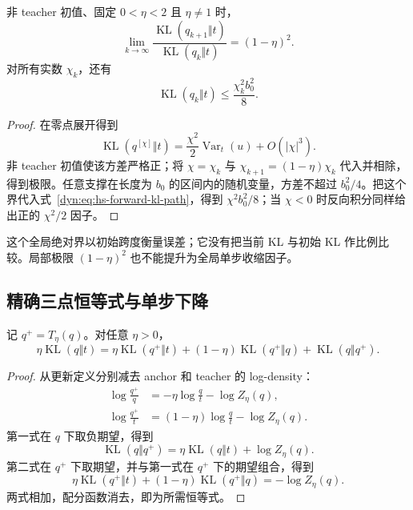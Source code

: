 \documentclass[lang=cn,scheme=chinese,openany]{../book/elegantbook}
\newcommand{\KL}{\operatorname{KL}}
\newcommand{\Var}{\operatorname{Var}}
\begin{document}
\begin{corollary}[局部 KL 速率与全局绝对界]
非 teacher 初值、固定 $0<\eta<2$ 且 $\eta\neq1$ 时，
\begin{equation*}
 \lim_{k\to\infty}
 \frac{\KL(q_{k+1}\Vert t)}{\KL(q_k\Vert t)}
 =(1-\eta)^2.
\end{equation*}
对所有实数 $\chi_k$，还有
\begin{equation*}
 \KL(q_k\Vert t)\leq\frac{\chi_k^2b_0^2}{8}.
\end{equation*}
\end{corollary}

\begin{proof}
在零点展开得到
\begin{equation*}
 \KL(q^{[\chi]}\Vert t)
 =\frac{\chi^2}{2}\Var_{t}(u)+O(|\chi|^3).
\end{equation*}
非 teacher 初值使该方差严格正；将 $\chi=\chi_k$ 与 $\chi_{k+1}=(1-\eta)\chi_k$ 代入并相除，得到极限。任意支撑在长度为 $b_0$ 的区间内的随机变量，方差不超过 $b_0^2/4$。把这个界代入式~\eqref{dyn:eq:hs-forward-kl-path}，得到 $\chi^2b_0^2/8$；当 $\chi<0$ 时反向积分同样给出正的 $\chi^2/2$ 因子。
\end{proof}

这个全局绝对界以初始跨度衡量误差；它没有把当前 KL 与初始 KL 作比例比较。局部极限 $(1-\eta)^2$ 也不能提升为全局单步收缩因子。

\subsection{精确三点恒等式与单步下降}

\begin{theorem}
\label{dyn:thm:hs-three-point}
记 $q^+=T_\eta(q)$。对任意 $\eta>0$，
\begin{equation}\label{dyn:eq:hs-three-point}
 \eta\KL(q\Vert t)
 =\eta\KL(q^+\Vert t)
 +(1-\eta)\KL(q^+\Vert q)
 +\KL(q\Vert q^+).
\end{equation}
\end{theorem}

\begin{proof}
从更新定义分别减去 anchor 和 teacher 的 log-density：
\begin{align*}
 \log\frac{q^+}{q}
 &=-\eta\log\frac{q}{t}-\log Z_\eta(q),\\
 \log\frac{q^+}{t}
 &=(1-\eta)\log\frac{q}{t}-\log Z_\eta(q).
\end{align*}
第一式在 $q$ 下取负期望，得到
\begin{equation*}
 \KL(q\Vert q^+)
 =\eta\KL(q\Vert t)+\log Z_\eta(q).
\end{equation*}
第二式在 $q^+$ 下取期望，并与第一式在 $q^+$ 下的期望组合，得到
\begin{equation*}
 \eta\KL(q^+\Vert t)
 +(1-\eta)\KL(q^+\Vert q)
 =-\log Z_\eta(q).
\end{equation*}
两式相加，配分函数消去，即为所需恒等式。
\end{proof}
\end{document}
